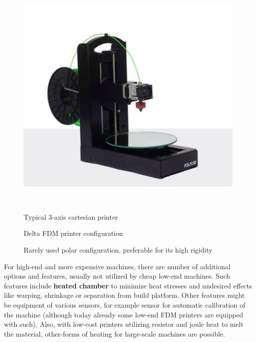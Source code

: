 \documentclass[a4paper, twoside, 11pt]{report}
\begin{document}
\begin{figure}[h]
\begin{minipage}[b]{0.3\textwidth}
  \end{minipage}
  \hfill
  \begin{minipage}[b]{0.3\textwidth}
    \includegraphics[width=\textwidth]{polarPrinter}
  \end{minipage}
  \\[5pt]
  
  \begin{minipage}[t]{0.3\textwidth}
    \caption{Typical 3-axis cartesian printer}
  \end{minipage}
  \hfill
  \begin{minipage}[t]{0.3\textwidth}
    \caption{Delta FDM printer configuration}
  \end{minipage}
  \hfill
  \begin{minipage}[t]{0.3\textwidth}
    \caption{Rarely used polar configuration, preferable for its high rigidity}
  \end{minipage}
  
\end{figure}
	For high-end and more expensive machines, there are number of additional options and features, usually not utilized by cheap low-end machines. Such features include \textbf{heated chamber} to minimize heat stresses and undesired effects like warping, shrinkage or separation from build platform. Other features might be equipment of various sensors, for example sensor for automatic calibration of the machine (although today already some low-end FDM printers are equipped with such). Also, with low-cost printers utilizing resistor and joule heat to melt the material, other-forms of heating for large-scale machines are possible.
\end{document}
